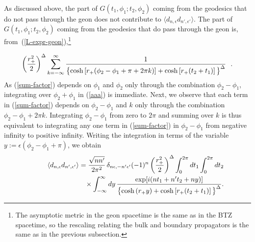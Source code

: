 \documentclass[a4paper,12pt]{article}
\begin{document}
As discussed above, the part of $G(t_1,\phi_1; t_2,\phi_2)$ coming
from the geodesics that do not pass through the geon does not
contribute to $\langle d_{n,\epsilon} d_{n',\epsilon'} \rangle$.  The
part of $G(t_1,\phi_1; t_2,\phi_2)$ coming from the geodesics that do
pass through the geon is, from~(\ref{L-expr-geon}),\footnote{The
asymptotic metric in the geon spacetime is the same as in the BTZ
spacetime, so the rescaling relating the bulk and boundary propagators
is the same as in the previous subsection.}

\begin{equation}
\left(\frac{r_+^2}{2}\right)^\Delta 
\sum_{k = -\infty}^{\infty} 
\frac{1}
{ \left\{
\cosh \left[r_+(\phi_2 - \phi_1 + \pi + 2\pi k ) \right] 
+ \cosh\left[r_+ (t_2 + t_1) \right]
\vphantom{A^A_A}
\right\}^\Delta
} 
\ \ . 
\label{sum-factor}
\end{equation}
As (\ref{sum-factor}) depends on $\phi_1$ and $\phi_2$ only through
the combination 
$\phi_2 - \phi_1$, 
integrating over $\phi_2 + \phi_1$ in (\ref{aaa})
is immediate. Next, we observe that each term in 
(\ref{sum-factor}) depends on 
$\phi_2-\phi_1$ and $k$ 
only through the combination $\phi_2 - \phi_1 + 2
\pi k$.  Integrating
$\phi_2 - \phi_1$ from zero to $2\pi$ and summing over $k$ 
is thus equivalent to
integrating any one term in 
(\ref{sum-factor}) in $\phi_2 - \phi_1$ from negative infinity to positive
infinity.   Writing the integration in terms of 
the variable $y := \epsilon ( \phi_2 - \phi_1 + \pi)$, we obtain 
\begin{eqnarray} 
\label{div-t-int}
&&\langle 
d_{n,\epsilon} d_{n',\epsilon'} 
\rangle
=
\frac{\sqrt{n n'}}{2\pi^2} 
\, 
\delta_{n\epsilon, -n'\epsilon'} (-1)^n
\left(\frac{r_+^2}{2}\right)^\Delta 
\int_{0}^{2\pi} dt_1 
\int_{0}^{2\pi} dt_2
\nonumber
\\
&&
\phantom{xxxxxxxxxxxx}
\times 
\int_{-\infty}^{\infty} dy 
\, 
\frac{ \exp[i(nt_1 + n't_2 + ny)] } 
{ \left\{
\cosh \left(r_+y \right) 
+ \cosh\left[r_+ (t_2 + t_1) \right]
\vphantom{A^A_A}
\right\}^\Delta
}.
\end{eqnarray}
\end{document}
